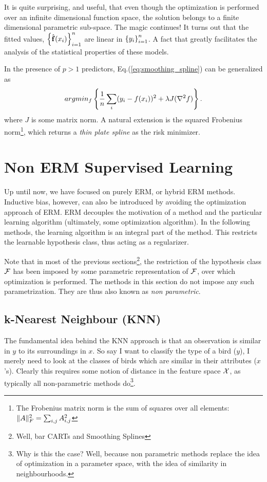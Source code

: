 It is quite surprising, and useful, that even though the optimization is performed over an infinite dimensional function space, the solution belongs to a finite dimensional parametric sub-space. 
The magic continues! It turns out that the fitted values, $\left\{ \hat{\mathbf{f}}(x_i) \right\}_{i=1}^n$ are linear in $\left\{ y_i \right\}_{i=1}^n$. A fact that greatly facilitates the analysis of the statistical properties of these models.

In the presence of $p>1$ predictors, Eq.(\ref{eq:smoothing_spline}) can be generalized as 
\begin{align}
\label{eq:smoothing_spline_multi}
	 argmin_{f}\left\{ \frac{1}{n}\sum_i (y_i-f(x_i))^2 + \lambda J(\nabla^2 f)   \right\}.
\end{align}
where $J$ is some matrix norm. A natural extension is the squared Frobenius norm\footnote{The Frobenius matrix norm is the sum of squares over all elements: $\Vert A \Vert^2_F=\sum_{i,j} A_{i,j}^2$ }, which returns a \emph{thin plate spline} as the risk minimizer.




\section{Non ERM Supervised Learning}
\label{sec:non_erm}
Up until now, we have focused on purely ERM, or hybrid ERM methods.
Inductive bias, however, can also be introduced by avoiding the optimization approach of ERM.
ERM decouples the motivation of a method and the particular learning algorithm (ultimately, some optimization algorithm).
In the following methods, the learning algorithm is an integral part of the method. 
This restricts the learnable hypothesis class, thus acting as a regularizer.

Note that in most of the previous sections\footnote{Well, bar CARTs and Smoothing Splines}, the restriction of the hypothesis class $\mathcal{F}$ has been imposed by some parametric representation of $\mathcal{F}$, over which optimization is performed.
The methods in this section do not impose any such parametrization. They are thus also known as \emph{non parametric}.

 

\subsection{k-Nearest Neighbour (KNN)}
\label{sec:knn}
The fundamental idea behind the KNN approach is that an observation is similar in $y$ to its surroundings in $x$. 
So say I want to classify the type of a bird ($y$), I merely need to look at the classes of birds which are similar in their attributes ($x$'s). 
Clearly this requires some notion of distance in the feature space $\mathcal{X}$, as typically all non-parametric methods do\footnote{Why is this the case? Well, because non parametric methods replace the idea of optimization in a parameter space, with the idea of similarity in neighbourhoods.}.

